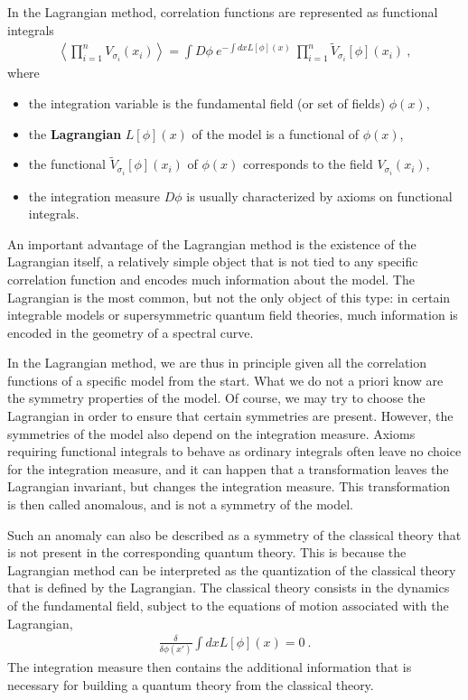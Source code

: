 \documentclass[12pt, a4paper, notitlepage, twoside]{report}
\numberwithin{equation}{section}
\theoremstyle{break}
\begin{document}
In the Lagrangian method, correlation functions are represented as functional integrals
\begin{align}
 \left\langle\prod_{i=1}^n V_{\sigma_i}(x_i)\right\rangle = \int D\phi\ e^{-\int dx L[\phi](x)} \ \prod_{i=1}^n \tilde{V}_{\sigma_i}[\phi](x_i)\ ,
\end{align}
where  
\begin{itemize}
 \item the integration variable is the fundamental field (or set of fields) $\phi(x)$,
\item the \textbf{\boldmath Lagrangian} $L[\phi](x)$ of the model is a functional of $\phi(x)$,
\item the functional $\tilde{V}_{\sigma_i}[\phi](x_i)$ of $\phi(x)$ corresponds to the field $ V_{\sigma_i}(x_i)$,
\item the integration measure $D\phi$ is usually characterized by axioms on functional integrals. 
\end{itemize}
An important advantage of the Lagrangian method is the existence of the Lagrangian itself, a relatively simple object that is not tied to any specific correlation function and encodes much information about the model.
The Lagrangian is the most common, but not the only object of this type: in certain integrable models or supersymmetric quantum field theories, much information is encoded in the geometry of a spectral curve.

In the Lagrangian method, we are thus in principle given all the correlation functions of a specific model from the start.
What we do not a priori know are the symmetry properties of the model.
Of course, we may try to choose the Lagrangian in order to ensure that certain symmetries are present.
However, the symmetries of the model also depend on the integration measure.
Axioms requiring functional integrals to behave as ordinary integrals often leave no choice for the integration measure, and 
it can happen that a transformation leaves the Lagrangian invariant, but changes the integration measure.
This transformation is then called anomalous, and is not a symmetry of the model.

Such an anomaly can also be described as a symmetry of the classical theory that is not present in the corresponding quantum theory.
This is because the Lagrangian method can be interpreted as the quantization of the classical theory that is defined by the Lagrangian.
The classical theory consists in the dynamics of the fundamental field, subject to the equations of motion associated with the Lagrangian, 
\begin{align}
 \frac{\delta }{\delta \phi(x')} \int dx L[\phi](x) = 0 \ .
\end{align}
The integration measure then contains the additional information that is necessary for building a quantum theory from the classical theory. 
\end{document}
